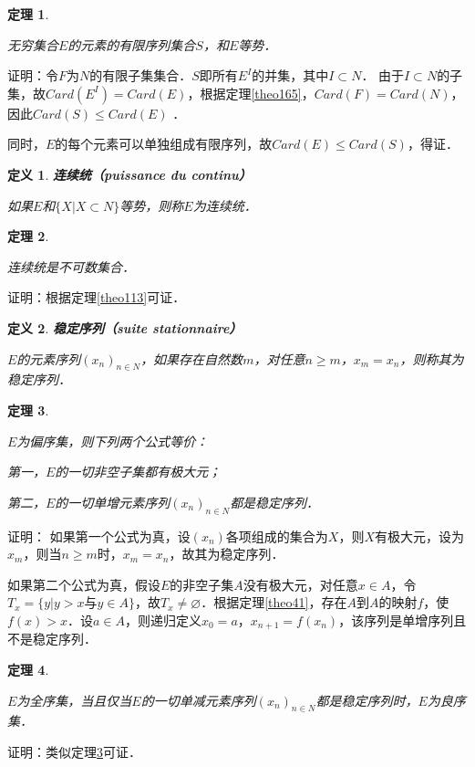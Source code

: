 \documentclass[12pt, a4paper, oneside]{book}
\newtheorem{theo}{定理}
\newtheorem{de}{定义}
\begin{document}
			\begin{theo}\label{theo166}
				\hfill\par
				无穷集合$E$的元素的有限序列集合$S$，和$E$等势．
			\end{theo}
			证明：令$F$为$N$的有限子集集合．$S$即所有$E^I$的并集，其中$I\subset N$．
			由于$I\subset N$的子集，故$Card(E^I)=Card(E)$，根据定理\ref{theo165}，$Card(F)=Card(N)$，因此$Card(S)\leq Card(E)$ ．
			\par
			同时，$E$的每个元素可以单独组成有限序列，故$Card(E)\leq Card(S)$，得证．
			
			\begin{de}
				\textbf{连续统（puissance du continu）}
				\par
				如果$E$和$\{X|X\subset N\}$等势，则称$E$为连续统．
			\end{de}
			
			\begin{theo}\label{theo167}
				\hfill\par
				连续统是不可数集合．
			\end{theo}
			证明：根据定理\ref{theo113}可证．
			
			\begin{de}
				\textbf{稳定序列（suite stationnaire）}
				\par
				$E$的元素序列$(x_n)_{n\in N}$，如果存在自然数$m$，对任意$n\geq m$，$x_m=x_n$，则称其为稳定序列．
			\end{de}
			
			\begin{theo}\label{theo168}
				\hfill\par
				$E$为偏序集，则下列两个公式等价：
				\par
				第一，$E$的一切非空子集都有极大元；
				\par
				第二，$E$的一切单增元素序列$(x_n)_{n\in N}$都是稳定序列．
			\end{theo}
			证明：
			如果第一个公式为真，设$(x_n)$各项组成的集合为$X$，则$X$有极大元，设为$x_m$，则当$n\geq m$时，$x_m=x_n$，故其为稳定序列．
			\par
			如果第二个公式为真，假设$E$的非空子集$A$没有极大元，对任意$x\in A$，令$T_x=\{y|y>x\text{与}y\in A\}$，故$T_x\neq \varnothing$．根据定理\ref{theo41}，存在$A$到$A$的映射$f$，使$f(x)>x$．设$a\in A$，则递归定义$x_0=a$，$x_{n+1}=f(x_n)$，该序列是单增序列且不是稳定序列．
			
			\begin{theo}\label{theo169}
				\hfill\par
				$E$为全序集，当且仅当$E$的一切单减元素序列$(x_n)_{n\in N}$都是稳定序列时，$E$为良序集．
			\end{theo}
			证明：类似定理\ref{theo168}可证．
			
\end{document}
